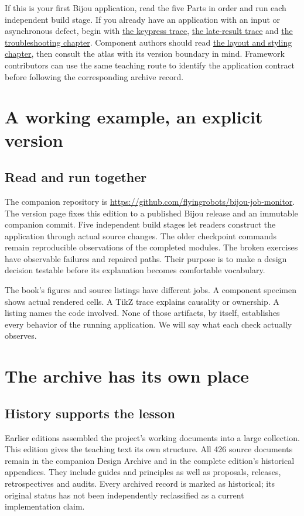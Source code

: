 If this is your first Bijou application, read the five Parts in order and run each independent build stage. If you already have an application with an input or asynchronous defect, begin with \hyperref[workshop-03]{the keypress trace}, \hyperref[workshop-04]{the late-result trace} and \hyperref[teaching-troubleshooting]{the troubleshooting chapter}. Component authors should read \hyperref[teaching-layout]{the layout and styling chapter}, then consult the atlas with its version boundary in mind. Framework contributors can use the same teaching route to identify the application contract before following the corresponding archive record.

\section*{A working example, an explicit version}
\subsection*{Read and run together}

The companion repository is \url{https://github.com/flyingrobots/bijou-job-monitor}. The version page fixes this edition to a published Bijou release and an immutable companion commit. Five independent build stages let readers construct the application through actual source changes. The older checkpoint commands remain reproducible observations of the completed modules. The broken exercises have observable failures and repaired paths. Their purpose is to make a design decision testable before its explanation becomes comfortable vocabulary.

The book's figures and source listings have different jobs. A component specimen shows actual rendered cells. A TikZ trace explains causality or ownership. A listing names the code involved. None of those artifacts, by itself, establishes every behavior of the running application. We will say what each check actually observes.

\section*{The archive has its own place}
\subsection*{History supports the lesson}

Earlier editions assembled the project's working documents into a large collection. This edition gives the teaching text its own structure. All 426 source documents remain in the companion Design Archive and in the complete edition's historical appendices. They include guides and principles as well as proposals, releases, retrospectives and audits. Every archived record is marked as historical; its original status has not been independently reclassified as a current implementation claim.

